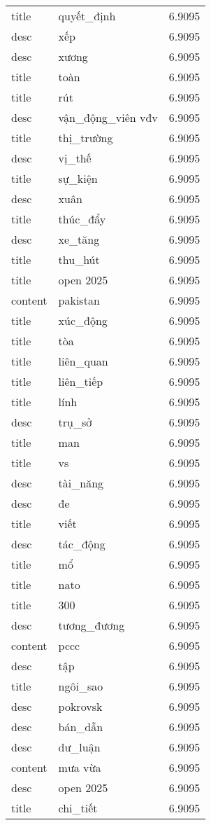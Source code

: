 \documentclass{article}
\begin{document}
\begin{tabular}{lll}
title & quyết\_định & 6.9095\\
desc & xếp & 6.9095\\
desc & xương & 6.9095\\
title & toàn & 6.9095\\
title & rút & 6.9095\\
desc & vận\_động\_viên vđv & 6.9095\\
title & thị\_trường & 6.9095\\
desc & vị\_thế & 6.9095\\
title & sự\_kiện & 6.9095\\
desc & xuân & 6.9095\\
title & thúc\_đẩy & 6.9095\\
desc & xe\_tăng & 6.9095\\
title & thu\_hút & 6.9095\\
title & open 2025 & 6.9095\\
content & pakistan & 6.9095\\
title & xúc\_động & 6.9095\\
title & tòa & 6.9095\\
title & liên\_quan & 6.9095\\
title & liên\_tiếp & 6.9095\\
title & lính & 6.9095\\
desc & trụ\_sở & 6.9095\\
title & man & 6.9095\\
title & vs & 6.9095\\
desc & tài\_năng & 6.9095\\
desc & đe & 6.9095\\
title & viết & 6.9095\\
desc & tác\_động & 6.9095\\
title & mổ & 6.9095\\
title & nato & 6.9095\\
title & 300 & 6.9095\\
desc & tương\_đương & 6.9095\\
content & pccc & 6.9095\\
desc & tập & 6.9095\\
title & ngôi\_sao & 6.9095\\
desc & pokrovsk & 6.9095\\
desc & bán\_dẫn & 6.9095\\
desc & dư\_luận & 6.9095\\
content & mưa vừa & 6.9095\\
desc & open 2025 & 6.9095\\
title & chi\_tiết & 6.9095\\

\end{tabular}
\end{document}

